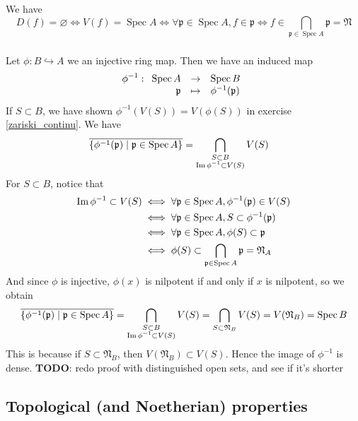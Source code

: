 \documentclass{article}
\DeclareMathOperator{\Spec}{Spec}
\renewcommand{\Im}{\mathop{\rm Im}}
\newcommand{\todo}{\textbf{TODO}}
\newcommand{\applic}[4]{\begin{array}[t]{rcl}
#1 & \to & #2 \\
#3 & \mapsto & #4
\end{array}}
\newcommand{\p}{\mathfrak{p}}
\newcommand{\exercise}{\subsubsection} %
\begin{document}
\exercise{} We have
\[D(f) = \varnothing \iff V(f) = \Spec A \iff \forall \p \in \Spec A, f \in \p \iff f \in \bigcap_{\p \in \Spec A} \p = \mathfrak{N}\]

\exercise{} Let $\phi : B \hookrightarrow A$ we an injective ring map. Then we have an induced map
\[\phi^{-1} : \applic{\Spec A}{\Spec B}{\p}{\phi^{-1}(\p)}\]
If $S\subset B$, we have shown $\phi^{-1}(V(S)) = V(\phi(S))$ in exercise \ref{zariski_continu}. We have
\begin{align*}
    \overline{\{\phi^{-1}(\p) \mid \p \in \Spec A\}} & = \bigcap_{\begin{subarray}{c}
        S \subset B \\ \Im \phi^{-1} \subset V(S)
    \end{subarray}} V(S)
\end{align*}
For $S \subset B$, notice that
\begin{align*}
    \Im \phi^{-1} \subset V(S)
    & \iff \forall \p \in \Spec A, \phi^{-1}(\p) \in V(S) \\
    & \iff \forall \p \in \Spec A, S \subset \phi^{-1}(\p) \\
    & \iff \forall \p \in \Spec A, \phi(S) \subset \p \\
    & \iff \phi(S) \subset \bigcap_{\p \in \Spec A} \p = \mathfrak{N}_A
\end{align*}
And since $\phi$ is injective, $\phi(x)$ is nilpotent if and only if $x$ is nilpotent, so we obtain
\[
    \overline{\{\phi^{-1}(\p) \mid \p \in \Spec A\}} = 
    \bigcap_{\begin{subarray}{c}
        S \subset B \\ \Im \phi^{-1} \subset V(S)
    \end{subarray}} V(S)
    = \bigcap_{\begin{subarray}{c}
        S \subset \mathfrak{N}_B
    \end{subarray}} V(S)
    = V(\mathfrak{N}_B) = \Spec B
\]
This is because if $S \subset \mathfrak{N}_B$, then $V(\mathfrak{N}_B) \subset V(S)$. Hence the image of $\phi^{-1}$ is dense.
\todo : redo proof with distinguished open sets, and see if it's shorter

\subsection{Topological (and Noetherian) properties}
\end{document}
